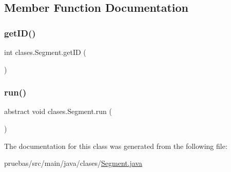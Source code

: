 \subsection{Member Function Documentation}
\mbox{\label{classclases_1_1_segment_ae3955a30788c0797ec6c9068a3bce050}} 
\subsubsection{\texorpdfstring{get\+I\+D()}{getID()}}
{\footnotesize\ttfamily int clases.\+Segment.\+get\+ID (\begin{DoxyParamCaption}{ }\end{DoxyParamCaption})}

\mbox{\label{classclases_1_1_segment_ab3f7658070f0da15727d8d852df0073b}} 
\subsubsection{\texorpdfstring{run()}{run()}}
{\footnotesize\ttfamily abstract void clases.\+Segment.\+run (\begin{DoxyParamCaption}{ }\end{DoxyParamCaption})\hspace{0.3cm}{\ttfamily [abstract]}}



The documentation for this class was generated from the following file\+:\begin{DoxyCompactItemize}
\item 
pruebas/src/main/java/clases/\mbox{\hyperlink{_segment_8java}{Segment.\+java}}\end{DoxyCompactItemize}
